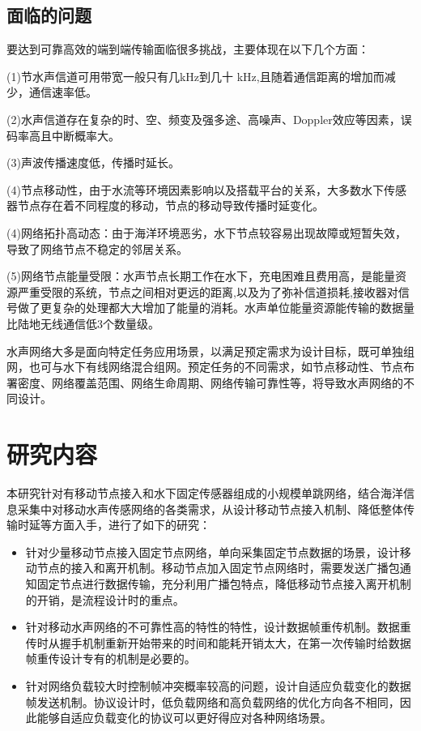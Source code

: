 \subsection{面临的问题}
要达到可靠高效的端到端传输面临很多挑战，主要体现在以下几个方面：

(1)节水声信道可用带宽一般只有几kHz到几十 kHz,且随着通信距离的增加而减少，通信速率低。

(2)水声信道存在复杂的时、空、频变及强多途、高噪声、Doppler效应等因素，误码率高且中断概率大。

(3)声波传播速度低，传播时延长。

(4)节点移动性，由于水流等环境因素影响以及搭载平台的关系，大多数水下传感器节点存在着不同程度的移动，节点的移动导致传播时延变化。

(4)网络拓扑高动态：由于海洋环境恶劣，水下节点较容易出现故障或短暂失效，导致了网络节点不稳定的邻居关系。

(5)网络节点能量受限：水声节点长期工作在水下，充电困难且费用高，是能量资源严重受限的系统，节点之间相对更远的距离,以及为了弥补信道损耗,接收器对信号做了更复杂的处理都大大增加了能量的消耗。水声单位能量资源能传输的数据量比陆地无线通信低3个数量级。

水声网络大多是面向特定任务应用场景，以满足预定需求为设计目标，既可单独组网，也可与水下有线网络混合组网。预定任务的不同需求，如节点移动性、节点布署密度、网络覆盖范围、网络生命周期、网络传输可靠性等，将导致水声网络的不同设计。

\section{研究内容}
本研究针对有移动节点接入和水下固定传感器组成的小规模单跳网络，结合海洋信息采集中对移动水声传感网络的各类需求，从设计移动节点接入机制、降低整体传输时延等方面入手，进行了如下的研究：
\begin{itemize}
	\item 针对少量移动节点接入固定节点网络，单向采集固定节点数据的场景，设计移动节点的接入和离开机制。移动节点加入固定节点网络时，需要发送广播包通知固定节点进行数据传输，充分利用广播包特点，降低移动节点接入离开机制的开销，是流程设计时的重点。
	\item 针对移动水声网络的不可靠性高的特性的特性，设计数据帧重传机制。数据重传时从握手机制重新开始带来的时间和能耗开销太大，在第一次传输时给数据帧重传设计专有的机制是必要的。
	\item 针对网络负载较大时控制帧冲突概率较高的问题，设计自适应负载变化的数据帧发送机制。协议设计时，低负载网络和高负载网络的优化方向各不相同，因此能够自适应负载变化的协议可以更好得应对各种网络场景。
\end{itemize}


